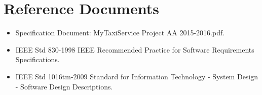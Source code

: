 \section{Reference Documents}
\begin{itemize}
	\item Specification Document: MyTaxiService Project AA 2015-2016.pdf.
	\item IEEE Std 830-1998 IEEE Recommended Practice for Software Requirements Specifications.
	\item IEEE Std 1016tm-2009 Standard for Information Technology - System Design - Software Design Descriptions.
\end{itemize}